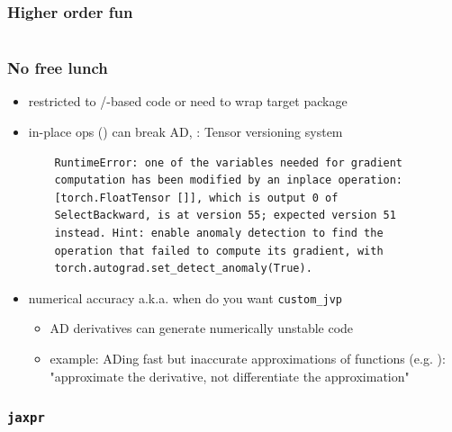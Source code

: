 \documentclass[fleqn,10pt]{beamer}
\begin{document}
\begin{frame}[fragile]
    \frametitle{Higher order fun}
    \inputminted{python}{code/higher_order_1.py}
    \vspace{-0.3cm}
\end{frame}


\begin{frame}[fragile]
    \frametitle{No free lunch}
    \begin{itemize}
        \item restricted to \numpy/\pytorch-based code or need to wrap target package
        \item in-place ops () can break AD, \pytorch: Tensor versioning system
        \begin{verbatim}
    RuntimeError: one of the variables needed for gradient
    computation has been modified by an inplace operation:
    [torch.FloatTensor []], which is output 0 of
    SelectBackward, is at version 55; expected version 51
    instead. Hint: enable anomaly detection to find the
    operation that failed to compute its gradient, with
    torch.autograd.set_detect_anomaly(True).
        \end{verbatim}
        \item numerical accuracy a.k.a. when do you want \verb|custom_jvp|
        \begin{itemize}
            \item AD derivatives can generate numerically unstable code
            \item example: ADing fast but inaccurate approximations of functions (e.g. ): "approximate the derivative, not differentiate
                the approximation"
        \end{itemize}
    \end{itemize}
\end{frame}


\begin{frame}
    \nocite{*}
    \printbibliography
\end{frame}

\begin{frame}
    \frametitle{\texttt{jaxpr}}
    \inputminted{python}{code/jaxpr.py}
\end{frame}
\end{document}
